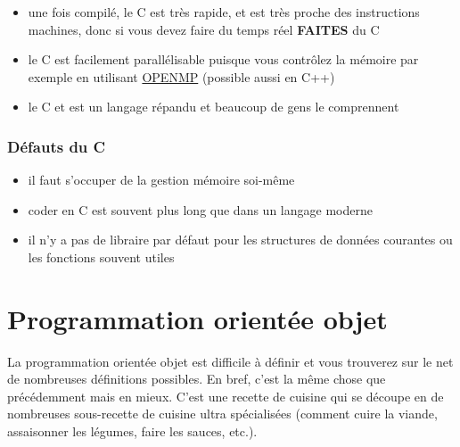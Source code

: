  
 
\begin{itemize}
\item une fois compilé, le C est très rapide, et est très proche des instructions machines,
donc si  vous devez faire du temps réel \textbf{FAITES} du C
\item le C est facilement parallélisable puisque vous contrôlez la mémoire
par exemple en utilisant \href{http://openmp.org/}{OPENMP} (possible aussi en C++)
\item le C et est un langage répandu et beaucoup de gens le comprennent
\end{itemize}

\subsubsection*{Défauts du C}

\begin{itemize}
\item il faut s'occuper de la gestion mémoire soi-même
\item coder en C est souvent plus long que dans un langage moderne
\item il n'y a pas de libraire par défaut pour les structures de données courantes ou les fonctions souvent utiles
\end{itemize}

\section{Programmation orientée objet}

La programmation orientée objet est difficile à définir et vous trouverez sur le net de nombreuses 
définitions possibles. En bref, c'est la même chose que précédemment mais en mieux. C'est une recette de cuisine qui se 
découpe en de nombreuses sous-recette de cuisine ultra spécialisées (comment cuire la viande,
assaisonner les légumes, faire les sauces, etc.).\\


